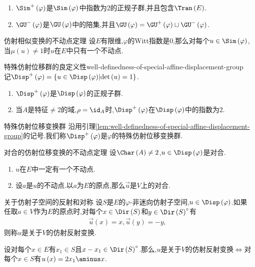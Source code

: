 \begin{remark}{}{}
	\begin{enumerate}
		\item $\Sim^{+}\left(\varphi\right)$是$\Sim\left(\varphi\right)$中指数为$2$的正规子群,并且包含$\Tran\left(E\right)$.
		\item $\GU^{-}\left(\varphi\right)$是$\GU\left(\varphi\right)$中的陪集,并且$\GU\left(\varphi\right)=\GU^{+}\left(\varphi\right)\sqcup\GU^{-}\left(\varphi\right)$.
	\end{enumerate}
\end{remark}

\begin{proposition}{仿射相似变换的不动点定理}{}
	设$E$有限维,$\varphi$的Witt指数是$0$,那么对每个$u\in\Sim\left(\varphi\right)$,当$\mu\left(u\right)\neq 1$时$u$在$E$中只有一个不动点.
\end{proposition}

\begin{lemma}{特殊仿射位移群的良定义性}{well-definedness-of-special-affine-displacement-group}
	记$\Disp^{+}\left(\varphi\right)=\left\{u\in\Disp\left(\varphi\right)\middle|\det\left(u\right)=1\right\}$.
	\begin{enumerate}
		\item $\Disp^{+}\left(\varphi\right)$是$\Disp\left(\varphi\right)$的正规子群.
		\item 当$A$是特征$\neq 2$的域,$\rho=\id_{A}$时,$\Disp^{+}\left(\varphi\right)$在$\Disp\left(\varphi\right)$中的指数为$2$.
	\end{enumerate}
\end{lemma}

\begin{definition}{特殊仿射位移变换群}{}
	沿用引理\ref{lem:well-definedness-of-special-affine-displacement-group}的记号.我们称$\Disp^{+}\left(\varphi\right)$是$\varphi$的特殊仿射位移变换群.
\end{definition}

\begin{proposition}{对合的仿射位移变换的不动点定理}{}
	设$\Char\left(A\right)\neq 2$,$u\in\Disp\left(\varphi\right)$是对合.
	\begin{enumerate}
		\item $u$在$E$中一定有一个不动点.
		\item 设$a$是$u$的不动点.以$a$为$E$的原点,那么$\vec{u}$是$V$上的对合.
	\end{enumerate}
\end{proposition}

\begin{definition}{关于仿射子空间的反射和对称}{}
	设$S$是$E$的$\varphi$-非迷向仿射子空间,$u\in\Disp\left(\varphi\right)$.如果任取$a\in V$作为$E$的原点时,对每个$x\in\Dir\left(S\right)$和$y\in\Dir\left(S\right)^{\circ}$有
	\begin{align*}
		\vec{u}\left(x\right)=x,\vec{u}\left(y\right)=-y,
	\end{align*}
	则称$u$是关于$V$的仿射反射变换.
\end{definition}

\begin{remark}{}{}
	设对每个$x\in E$有$x_{1}\in S$且$x-x_{1}\in \Dir\left(S\right)^{\circ}$.那么,$u$是关于$V$的仿射反射变换$\iff$对每个$x\in S$有$u\left(x\right)=2x_{1}\aminus x$.
\end{remark}
